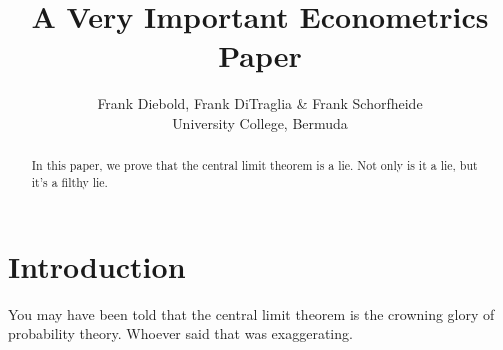 \documentclass[12pt,letterpaper]{article}
\title{A Very Important Econometrics Paper}
\author{Frank Diebold, Frank DiTraglia & Frank Schorfheide \\ University College, Bermuda}
\begin{document}
\maketitle

\begin{abstract}
	In this paper, we prove that the central limit theorem is a lie. 
	Not only is it a lie, but it's a filthy lie.
\end{abstract}

\section{Introduction}
You may have been told that the central limit theorem is the crowning glory of probability theory.
Whoever said that was exaggerating. 
\end{document}
